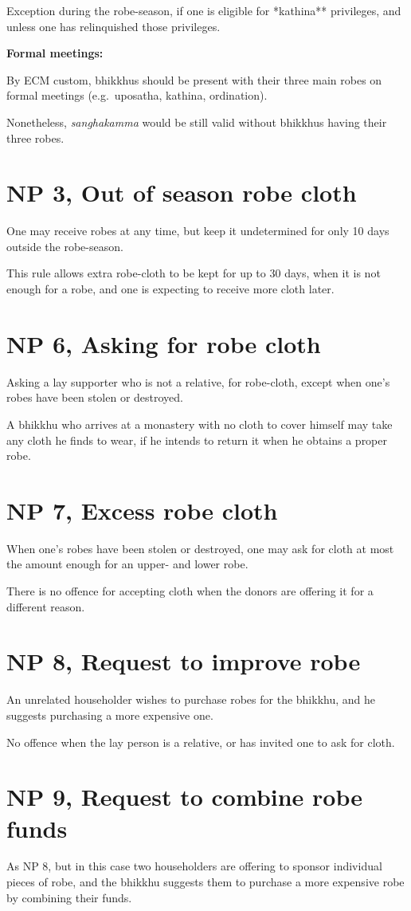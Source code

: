 Exception during the robe-season, if one is eligible for *kathina**
privileges, and unless one has relinquished those privileges.

\textbf{Formal meetings:}

By ECM custom, bhikkhus should be present with their three main robes on
formal meetings (e.g.~uposatha, kathina, ordination).

Nonetheless, \emph{sanghakamma} would be still valid without bhikkhus
having their three robes.

\clearpage

\section{NP 3, Out of season robe cloth}

One may receive robes at any time, but keep it undetermined for only 10
days outside the robe-season.

This rule allows extra robe-cloth to be kept for up to 30 days, when it
is not enough for a robe, and one is expecting to receive more cloth
later.

\section{NP 6, Asking for robe cloth}

Asking a lay supporter who is not a relative, for robe-cloth, except
when one's robes have been stolen or destroyed.

A bhikkhu who arrives at a monastery with no cloth to cover himself may
take any cloth he finds to wear, if he intends to return it when he
obtains a proper robe.

\section{NP 7, Excess robe cloth}

When one's robes have been stolen or destroyed, one may ask for cloth at
most the amount enough for an upper- and lower robe.

There is no offence for accepting cloth when the donors are offering it
for a different reason.

\section{NP 8, Request to improve robe}

\enlargethispage{2\baselineskip}

An unrelated householder wishes to purchase robes for the bhikkhu, and
he suggests purchasing a more expensive one.

No offence when the lay person is a relative, or has invited one to ask
for cloth.

\section{NP 9, Request to combine robe funds}

As NP 8, but in this case two householders are offering to sponsor
individual pieces of robe, and the bhikkhu suggests them to purchase a
more expensive robe by combining their funds.

